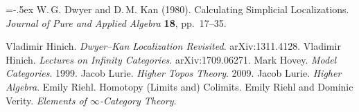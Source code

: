 \small
\begin{thebibliography}{MMMM}
    \itemsep=-.5ex
     W.\,G. Dwyer and D.\,M. Kan (1980).
    Calculating Simplicial Localizations.
    \emph{Journal of Pure and Applied Algebra} \textbf{18}, pp.\ 17--35.

     Vladimir Hinich. \emph{Dwyer--Kan Localization Revisited}. arXiv:1311.4128.
     Vladimir Hinich. \emph{Lectures on Infinity Categories}. arXiv:1709.06271.
     Mark Hovey. \emph{Model Categories}. 1999.
     Jacob Lurie. \emph{Higher Topos Theory}. 2009.
     Jacob Lurie. \emph{Higher Algebra}.
     Emily Riehl. Homotopy (Limits and) Colimits.
     Emily Riehl and Dominic Verity. \emph{Elements of $\infty$-Category Theory}.
\end{thebibliography}
